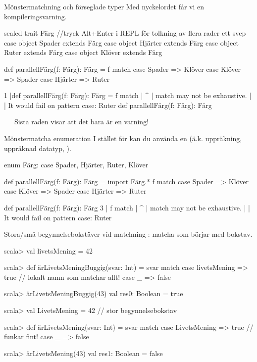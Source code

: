 \begin{Slide}{Mönstermatchning och förseglade typer}\SlideFontSmall
Med nyckelordet  får vi en kompileringsvarning.
\begin{Code}
sealed trait Färg //tryck Alt+Enter i REPL för tolkning av flera rader ett svep
case object Spader  extends Färg
case object Hjärter extends Färg
case object Ruter   extends Färg
case object Klöver  extends Färg

def parallellFärg(f: Färg): Färg = f match 
  case Spader  => Klöver
  case Klöver  => Spader
  case Hjärter => Ruter
\end{Code}
\begin{REPL}
1 |def parallellFärg(f: Färg): Färg = f match 
  |                                   ^
  |                           match may not be exhaustive.
  |
  |                           It would fail on pattern case: Ruter
def parallellFärg(f: Färg): Färg
\end{REPL}
 \code{:)} ~~~Sista raden visar att det bara är en varning!
\end{Slide}

\begin{Slide}{Mönstermatcha enumeration}\SlideFontSmall
I stället för  kan du använda en  (ä.k. uppräkning, uppräknad datatyp, ).
\begin{Code}
enum Färg:
  case Spader, Hjärter, Ruter, Klöver
  
def parallellFärg(f: Färg): Färg = 
  import Färg.*
  f match 
    case Spader  => Klöver
    case Klöver  => Spader
    case Hjärter => Ruter
\end{Code}
\pause
\begin{REPL}
def parallellFärg(f: Färg): Färg
3 |  f match 
  |  ^
  |  match may not be exhaustive.
  |
  |  It would fail on pattern case: Ruter
\end{REPL}
 \code{:)} 
\end{Slide}

\begin{Slide}{Stora/små begynnelsebokstäver vid matchning}
: matcha  som börjar med  bokstav.
\begin{REPL}
scala> val livetsMening = 42

scala> def ärLivetsMeningBuggig(svar: Int) = svar match 
         case livetsMening => true    // lokalt namn som matchar allt!
         case _ => false

scala> ärLivetsMeningBuggig(43)
val res0: Boolean = true

scala> val LivetsMening = 42   // stor begynnelsebokstav

scala> def ärLivetsMening(svar: Int) = svar match 
         case LivetsMening => true    // funkar fint!
         case _ => false

scala> ärLivetsMening(43)
val res1: Boolean = false
\end{REPL}
\end{Slide}


